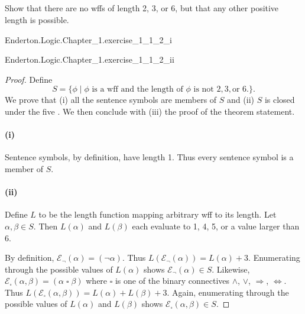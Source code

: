 \documentclass{report}
\begin{document}
\subsection{}%

  Show that there are no wffs of length 2, 3, or 6, but that any other positive
    length is possible.

    {Enderton.Logic.Chapter\_1.exercise\_1\_1\_2\_i}

    {Enderton.Logic.Chapter\_1.exercise\_1\_1\_2\_ii}

  \begin{proof}

    Define $$S = \{ \phi \mid
      \phi \text{ is a wff and the length of } \phi
        \text{ is not } 2, 3, \text{or } 6. \}.$$
    We prove that (i) all the sentence symbols are members of $S$ and (ii)
      $S$ is closed under the five .
    We then conclude with (iii) the proof of the theorem statement.

    \paragraph{(i)}%

      Sentence symbols, by definition, have length 1.
      Thus every sentence symbol is a member of $S$.

    \paragraph{(ii)}%

      Define $L$ to be the length function mapping arbitrary wff to its length.
      Let $\alpha, \beta \in S$.
      Then $L(\alpha)$ and $L(\beta)$ each evaluate to 1, 4, 5, or a value
        larger than 6.

      By definition, $\mathcal{E}_{\neg}(\alpha) = (\neg \alpha)$.
      Thus $L(\mathcal{E}_{\neg}(\alpha)) = L(\alpha) + 3$.
      Enumerating through the possible values of $L(\alpha)$ shows
        $\mathcal{E}_{\neg}(\alpha) \in S$.
      Likewise,
        $\mathcal{E}_{\square}(\alpha, \beta) = (\alpha \mathop{\square} \beta)$
        where $\square$ is one of the binary connectives $\land$, $\lor$,
          $\Rightarrow$, $\Leftrightarrow$.
      Thus $L(\mathcal{E}_{\square}(\alpha, \beta)) = L(\alpha) + L(\beta) + 3$.
      Again, enumerating through the possible values of $L(\alpha)$ and
        $L(\beta)$ shows $\mathcal{E}_{\square}(\alpha, \beta) \in S$.


\end{proof}
\end{document}
